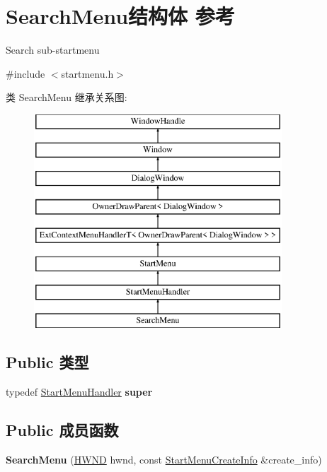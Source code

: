 \hypertarget{struct_search_menu}{}\section{Search\+Menu结构体 参考}
\label{struct_search_menu}


Search sub-\/startmenu  




{\ttfamily \#include $<$startmenu.\+h$>$}

类 Search\+Menu 继承关系图\+:\begin{figure}[H]
\begin{center}
\leavevmode
\includegraphics[height=8.000000cm]{struct_search_menu}
\end{center}
\end{figure}
\subsection*{Public 类型}
\begin{DoxyCompactItemize}
\item 
\mbox{\label{struct_search_menu_a51508901a2869b1d30be6b7bed0c25d4}} 
typedef \hyperlink{struct_start_menu_handler}{Start\+Menu\+Handler} {\bfseries super}
\end{DoxyCompactItemize}
\subsection*{Public 成员函数}
\begin{DoxyCompactItemize}
\item 
\mbox{\label{struct_search_menu_aa93898fcdd329447bbeca1c17509b699}} 
{\bfseries Search\+Menu} (\hyperlink{interfacevoid}{H\+W\+ND} hwnd, const \hyperlink{struct_start_menu_create_info}{Start\+Menu\+Create\+Info} \&create\+\_\+info)
\end{DoxyCompactItemize}

